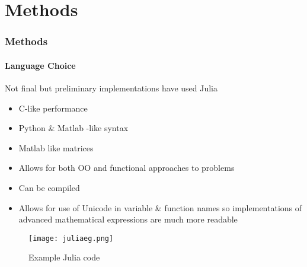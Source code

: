 \documentclass{beamer}
\begin{document}
\section{Methods}
\begin{frame}
    \frametitle{Methods}
    \framesubtitle{Language Choice} 
    Not final but preliminary implementations have used Julia\cite{JuliaProgrammingLanguage}
    \begin{itemize}
        \item C-like performance
        \item Python \& Matlab -like syntax
        \item Matlab like matrices 
        \item Allows for both OO and functional approaches to problems
        \item Can be compiled
        \item Allows for use of Unicode in variable \& function names so implementations of advanced mathematical expressions are much more readable
    \end{itemize}
\end{frame}

\begin{frame}
    \begin{figure}[Example Julia code]
        \centering
        \texttt{[image: juliaeg.png]}
        \caption{Example Julia code}%
        \label{fig:name}
    \end{figure}
\end{frame}
\end{document}

